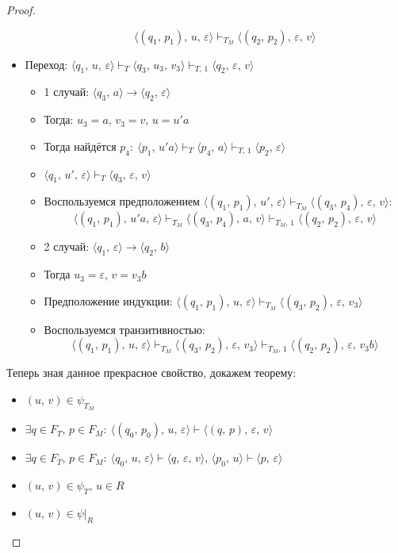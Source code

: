 \documentclass[a4paper,12pt]{article}
\theoremstyle{plain}
\theoremstyle{definition}
\theoremstyle{remark}
\begin{document}
\begin{proof}
\begin{itemize}
\begin{itemize}
			            \[
				            \langle(q_1,\,p_1),\,u,\,\varepsilon\rangle\vdash_{T_M}\langle(q_2,\,p_2),\,\varepsilon,\,v\rangle
			            \]
		      \end{itemize}
		\item Переход: $\langle q_1,\,u,\,\varepsilon\rangle\vdash_T\langle q_3,\,u_3,\,v_3\rangle\vdash_{T,\,1}\langle q_2,\,\varepsilon,\,v\rangle$
		      \begin{itemize}
			      \item 1 случай: $\langle q_3,\,a\rangle\to\langle q_2,\,\varepsilon\rangle$
			      \item Тогда: $u_3 = a,\, v_3 = v,\, u = u'a$
			      \item Тогда найдётся $p_4 :\: \langle p_1,\,u'a\rangle\vdash_T\langle p_4,\,a\rangle\vdash_{T,\,1}\langle p_2,\,\varepsilon\rangle$
			      \item $\langle q_1,\,u',\,\varepsilon\rangle\vdash_T\langle q_3,\,\varepsilon,\,v\rangle$
			      \item Воспользуемся предположением $\langle(q_1,\,p_1),\,u',\,\varepsilon\rangle\vdash_{T_M}\langle(q_3,\,p_4),\,\varepsilon,\,v\rangle$:
			            \[
				            \langle(q_1,\,p_1),\,u'a,\,\varepsilon\rangle\vdash_{T_M}\langle(q_3,\,p_4),\,a,\,v\rangle\vdash_{T_M,\,1}\langle(q_2,\,p_2),\,\varepsilon,\,v\rangle
			            \]
			      \item 2 случай: $\langle q_1,\,\varepsilon\rangle\to\langle q_2,\,b\rangle$
			      \item Тогда $u_3 = \varepsilon,\, v = v_3b$
			      \item Предположение индукции: $\langle(q_1,\,p_1),\,u,\,\varepsilon\rangle\vdash_{T_M}\langle(q_3,\,p_2),\,\varepsilon,\,v_3\rangle$
			      \item Воспользуемся транзитивностью:
			            \[
				            \langle(q_1,\,p_1),\,u,\,\varepsilon\rangle\vdash_{T_M}\langle(q_3,\,p_2),\,\varepsilon,\,v_3\rangle \vdash_{T_M,\,1}\langle(q_2,\,p_2),\,\varepsilon,\,v_3b\rangle
			            \]
		      \end{itemize}
	\end{itemize}
	Теперь зная данное прекрасное свойство, докажем теорему:
	\begin{itemize}
		\item $(u,\,v) \in \psi_{T_M}$
		\item $\exists q \in F_T,\, p \in F_M :\: \langle(q_0,\,p_0),\,u,\,\varepsilon\rangle\vdash\langle(q,\,p),\,\varepsilon,\,v\rangle$
		\item $\exists q \in F_T,\, p \in F_M :\: \langle q_0,\,u,\,\varepsilon\rangle\vdash\langle q,\,\varepsilon,\,v\rangle,\,\langle p_0,\,u\rangle\vdash\langle p,\,\varepsilon\rangle$
		\item $(u,\,v) \in \psi_T,\, u \in R$
		\item $(u,\, v) \in \psi\vert_R$
	\end{itemize}
\end{proof}
\end{document}
